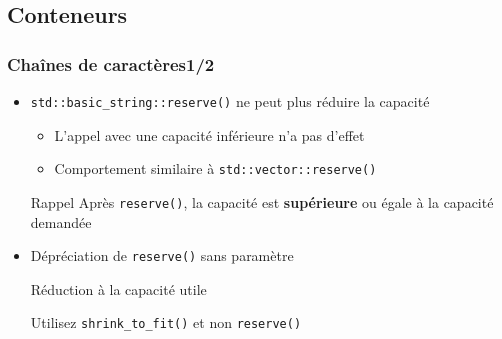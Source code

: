 \documentclass[C++.tex]{subfiles}
\begin{document}
\subsection*{Conteneurs}
\begin{frame}[fragile]
	\frametitle{Chaînes de caractères\titlehfill{}1/2}
	\begin{itemize}
		\item \lstinline|std::basic_string::reserve()| ne peut plus réduire la capacité
		\begin{itemize}
			\item L'appel avec une capacité inférieure n'a pas d'effet


			\item Comportement similaire à \lstinline|std::vector::reserve()|
		\end{itemize}

		\begin{block}{Rappel}
			Après \lstinline|reserve()|, la capacité est \textbf{supérieure} ou égale à la capacité demandée
		\end{block}

		\item Dépréciation de \lstinline|reserve()| sans paramètre

		\begin{block}{Réduction à la capacité utile}

			Utilisez \lstinline|shrink_to_fit()| et non \lstinline|reserve()|

		\end{block}
	\end{itemize}
\end{frame}
\end{document}
